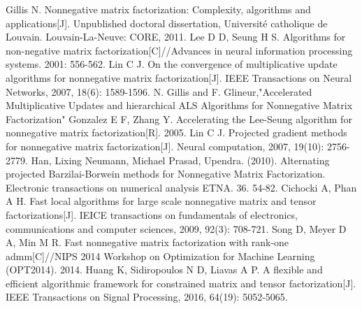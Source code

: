 \documentclass{article}
\begin{document}
\begin{thebibliography}{99}  
	Gillis N. Nonnegative matrix factorization: Complexity, algorithms and applications[J]. Unpublished doctoral dissertation, Université catholique de Louvain. Louvain-La-Neuve: CORE, 2011.
	Lee D D, Seung H S. Algorithms for non-negative matrix factorization[C]//Advances in neural information processing systems. 2001: 556-562.
	Lin C J. On the convergence of multiplicative update algorithms for nonnegative matrix factorization[J]. IEEE Transactions on Neural Networks, 2007, 18(6): 1589-1596.
	N. Gillis and F. Glineur,"Accelerated Multiplicative Updates and hierarchical ALS Algorithms for Nonnegative Matrix Factorization"
	Gonzalez E F, Zhang Y. Accelerating the Lee-Seung algorithm for nonnegative matrix factorization[R]. 2005.
	Lin C J. Projected gradient methods for nonnegative matrix factorization[J]. Neural computation, 2007, 19(10): 2756-2779.
	Han, Lixing  Neumann, Michael Prasad, Upendra. (2010). Alternating projected Barzilai-Borwein methods for Nonnegative Matrix Factorization. Electronic transactions on numerical analysis ETNA. 36. 54-82. 
	Cichocki A, Phan A H. Fast local algorithms for large scale nonnegative matrix and tensor factorizations[J]. IEICE transactions on fundamentals of electronics, communications and computer sciences, 2009, 92(3): 708-721.
	Song D, Meyer D A, Min M R. Fast nonnegative matrix factorization with rank-one admm[C]//NIPS 2014 Workshop on Optimization for Machine Learning (OPT2014). 2014.
	Huang K, Sidiropoulos N D, Liavas A P. A flexible and efficient algorithmic framework for constrained matrix and tensor factorization[J]. IEEE Transactions on Signal Processing, 2016, 64(19): 5052-5065.
\end{thebibliography}
\end{document}
